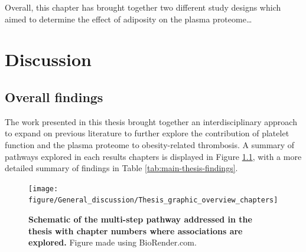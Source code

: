 \documentclass[11pt,twoside]{bristolthesis}
\begin{document}
Overall, this chapter has brought together two different study designs which aimed to determine the effect of adiposity on the plasma proteome\ldots{}

\hypertarget{discussion-6}{%
\chapter{Discussion}\label{discussion-6}}

\hypertarget{overall-findings}{%
\section{Overall findings}\label{overall-findings}}

The work presented in this thesis brought together an interdisciplinary approach to expand on previous literature to further explore the contribution of platelet function and the plasma proteome to obesity-related thrombosis. A summary of pathways explored in each results chapters is displayed in Figure \ref{fig:Thesis-schematic-chaps}, with a more detailed summary of findings in Table \ref{tab:main-thesis-findings}.



\begin{figure}
\texttt{[image: figure/General\_discussion/Thesis\_graphic\_overview\_chapters]} \caption[Schematic of the multi-step pathway addressed in the thesis with chapter numbers where associations are explored]{\textbf{Schematic of the multi-step pathway addressed in the thesis with chapter numbers where associations are explored.} Figure made using BioRender.com.}\label{fig:Thesis-schematic-chaps}
\end{figure}
\end{document}

